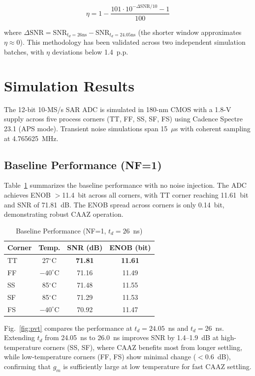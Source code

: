 \documentclass[journal]{IEEEtran}
\begin{document}
\begin{equation}
\eta = 1 - \frac{101\cdot 10^{-\Delta\text{SNR}/10} - 1}{100}
\label{eq:eta}
\end{equation}

where $\Delta\text{SNR} = \text{SNR}_{t_d=26\text{ns}} - \text{SNR}_{t_d=24.05\text{ns}}$ (the shorter window approximates $\eta\approx0$). This methodology has been validated across two independent simulation batches, with $\eta$ deviations below 1.4~p.p.

\section{Simulation Results}
\label{sec:sim}

The 12-bit 10-MS/s SAR ADC is simulated in 180-nm CMOS with a 1.8-V supply across five process corners (TT, FF, SS, SF, FS) using Cadence Spectre 23.1 (APS mode). Transient noise simulations span 15~$\mu$s with coherent sampling at 4.765625~MHz.

\subsection{Baseline Performance (NF=1)}

Table~\ref{tab:nf1} summarizes the baseline performance with no noise injection. The ADC achieves ENOB $>$11.4~bit across all corners, with TT corner reaching 11.61~bit and SNR of 71.81~dB. The ENOB spread across corners is only 0.14~bit, demonstrating robust CAAZ operation.

\begin{table}[htbp]
\centering
\caption{Baseline Performance (NF=1, $t_d=26$~ns)}
\label{tab:nf1}
\small
\begin{tabular}{lccc}
\toprule
\textbf{Corner} & \textbf{Temp.} & \textbf{SNR (dB)} & \textbf{ENOB (bit)} \\
\midrule
TT & 27$^\circ$C & \textbf{71.81} & \textbf{11.61} \\
FF & $-40^\circ$C & 71.16 & 11.49 \\
SS & 85$^\circ$C & 71.48 & 11.55 \\
SF & 85$^\circ$C & 71.29 & 11.53 \\
FS & $-40^\circ$C & 70.92 & 11.47 \\
\bottomrule
\end{tabular}
\end{table}

Fig.~\ref{fig:pvt} compares the performance at $t_d=24.05$~ns and $t_d=26$~ns. Extending $t_d$ from 24.05~ns to 26.0~ns improves SNR by 1.4--1.9~dB at high-temperature corners (SS, SF), where CAAZ benefits most from longer settling, while low-temperature corners (FF, FS) show minimal change ($<$0.6~dB), confirming that $g_m$ is sufficiently large at low temperature for fast CAAZ settling.
\end{document}
